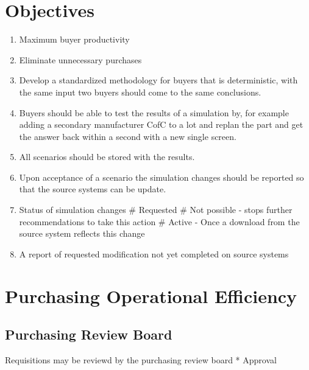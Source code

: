 \documentclass[letterpaper,10pt,english]{sphinxmanual}
\begin{document}
\section{Objectives}
\label{BusinessProcessReengineering:objectives}\begin{enumerate}
\item {} 
Maximum buyer productivity

\item {} 
Eliminate unnecessary purchases

\item {} 
Develop a standardized methodology for buyers that is deterministic,
with the same input two buyers should come to the same conclusions.

\item {} 
Buyers should be able to test the results of a simulation by, for
example adding a secondary manufacturer CofC to a lot and replan the
part and get the answer back within a second with a new single
screen.

\item {} 
All scenarios should be stored with the results.

\item {} 
Upon acceptance of a scenario the simulation changes should be
reported so that the source systems can be update.

\item {} 
Status of simulation changes \# Requested \# Not possible - stops
further recommendations to take this action \# Active - Once a
download from the source system reflects this change

\item {} 
A report of requested modification not yet completed on source
systems

\end{enumerate}


\section{Purchasing Operational Efficiency}
\label{BusinessProcessReengineering:purchasing-operational-efficiency}

\subsection{Purchasing Review Board}
\label{BusinessProcessReengineering:purchasing-review-board}
\begin{DUlineblock}{0em}
\item[] Requisitions may be reviewd by the purchasing review board * Approval
\end{DUlineblock}
\end{document}
